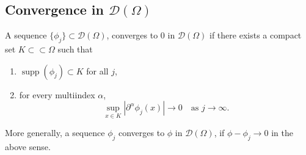 \subsection{Convergence in $\mathcal{D}(\Omega)$}
A sequence $\{\phi_j\}\subset\mathcal{D}(\Omega)$, converges to 0 in $\mathcal{D}(\Omega)$ if there exists a compact set $K\subset\subset\Omega$ such that
\begin{enumerate}
    \item $\operatorname{supp}(\phi_j)\subset K$ for all $j$,
    \item for every multiindex $\alpha$,
    \[ \sup_{x\in K}|\partial^\alpha\phi_j(x)|\to 0 \quad \text{as } j\to\infty. 
    \]
\end{enumerate}
More generally, a sequence $\phi_j$ converges to $\phi$ in $\mathcal{D}(\Omega)$, if $\phi-\phi_j\to 0$ in the above sense. 

